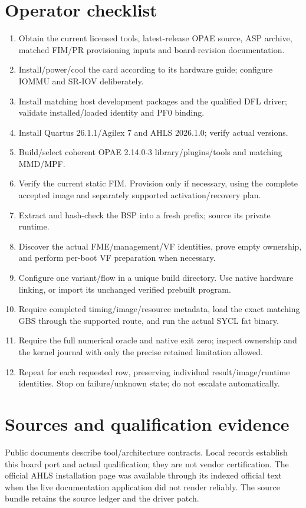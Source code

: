 \documentclass[11pt,letterpaper]{article}
\newcommand{\code}[1]{{\ttfamily\expandafter\seqsplit\expandafter{\detokenize{#1}}}}
\newcommand{\chapterstart}[1]{\clearpage\section{#1}}
\begin{document}
\chapterstart{Operator checklist}
\begin{enumerate}
\item Obtain the current licensed tools, latest-release OPAE source, ASP archive,
matched FIM/PR provisioning inputs and board-revision documentation.
\item Install/power/cool the card according to its hardware guide; configure
IOMMU and SR-IOV deliberately.
\item Install matching host development packages and the qualified DFL driver;
validate installed/loaded identity and PF0 binding.
\item Install Quartus 26.1.1/Agilex 7 and AHLS 2026.1.0; verify actual versions.
\item Build/select coherent OPAE 2.14.0-3 library/plugins/tools and matching MMD/MPF.
\item Verify the current static FIM. Provision only if necessary, using the
complete accepted image and separately supported activation/recovery plan.
\item Extract and hash-check the BSP into a fresh prefix; source its private runtime.
\item Discover the actual FME/management/VF identities, prove empty ownership,
and perform per-boot VF preparation when necessary.
\item Configure one variant/flow in a unique build directory. Use native hardware
\code{-Xstarget} linking, or import its unchanged verified prebuilt program.
\item Require completed timing/image/resource metadata, load the exact matching
GBS through the supported route, and run the actual SYCL fat binary.
\item Require the full numerical oracle and native exit zero; inspect ownership
and the kernel journal with only the precise retained limitation allowed.
\item Repeat for each requested row, preserving individual result/image/runtime
identities. Stop on failure/unknown state; do not escalate automatically.
\end{enumerate}

\clearpage
\section*{Sources and qualification evidence}
Public documents describe tool/architecture contracts. Local records establish
this board port and actual qualification; they are not vendor certification.
The official AHLS installation page was available through its indexed official
text when the live documentation application did not render reliably. The
source bundle retains the source ledger and the driver patch.

\end{document}
